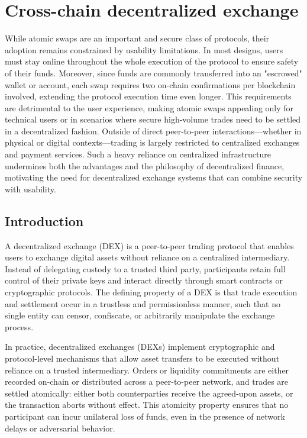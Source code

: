 

\section{Cross-chain decentralized exchange}

While atomic swaps are an important and secure class of protocols, their adoption remains constrained by usability limitations. In most designs, users must stay online throughout the whole execution of the protocol to ensure safety of their funds. Moreover, since funds are commonly transferred into an "escrowed" wallet or account, each swap requires two on-chain confirmations per blockchain involved,  extending the protocol execution time even longer. This requirements are detrimental to the user experience, making atomic swaps appealing only for technical users or in scenarios where secure high-volume trades need to be settled in a decentralized fashion.
Outside of direct peer-to-peer interactions—whether in physical or digital contexts—trading is largely restricted to centralized exchanges and payment services. Such a heavy reliance on centralized infrastructure undermines both the advantages and the philosophy of decentralized finance, motivating the need for decentralized exchange systems that can combine security with usability.

\subsection{Introduction}

A decentralized exchange (DEX) is a peer-to-peer trading protocol that enables users to exchange digital assets without reliance on a centralized intermediary. Instead of delegating custody to a trusted third party, participants retain full control of their private keys and interact directly through smart contracts or cryptographic protocols. The defining property of a DEX is that trade execution and settlement occur in a trustless and permissionless manner, such that no single entity can censor, confiscate, or arbitrarily manipulate the exchange process.

In practice, decentralized exchanges (DEXs) implement cryptographic and protocol-level mechanisms that allow asset transfers to be executed without reliance on a trusted intermediary. Orders or liquidity commitments are either recorded on-chain or distributed across a peer-to-peer network, and trades are settled atomically: either both counterparties receive the agreed-upon assets, or the transaction aborts without effect. This atomicity property ensures that no participant can incur unilateral loss of funds, even in the presence of network delays or adversarial behavior.

